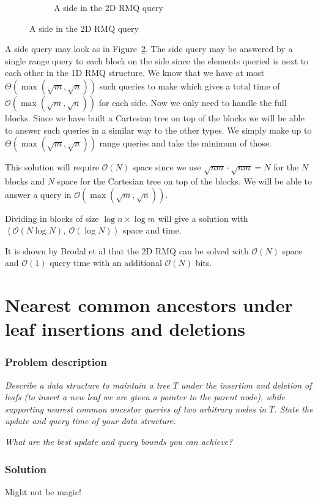 \documentclass[a4paper,oneside,article,11pt]{memoir}
\begin{document}
\begin{figure}[htbp!]
\begin{subfigure}[b]{0.49\textwidth}
        \caption{A side in the 2D RMQ query}
        \label{fig:rmq_side}
    \end{subfigure}
\end{figure}

A side query may look as in Figure~\ref{fig:rmq_side}. The side query may be answered by a single range query to each block on the side since the elements queried is next to each other in the 1D RMQ structure. We know that we have at most $\Theta(\max(\sqrt{m},\sqrt{n}))$ such queries to make which gives a total time of $\mathcal{O}(\max(\sqrt{m},\sqrt{n}))$ for each side.
Now we only need to handle the full blocks. Since we have built a Cartesian tree on top of the blocks we will be able to answer such queries in a similar way to the other types. We simply make up to $\Theta(\max(\sqrt{m},\sqrt{n}))$ range queries and take the minimum of those.

This solution will require $\mathcal{O}(N)$ space since we use $\sqrt{nm} \cdot \sqrt{nm} = N$ for the $N$ blocks and $N$ space for the Cartesian tree on top of the blocks. We will be able to answer a query in $\mathcal{O}(\max(\sqrt{m},\sqrt{n}))$.

Dividing in blocks of size $\log n \times \log m$ will give a solution with $\left\langle \mathcal{O}(N\log N),\ \mathcal{O}(\log N)\right\rangle$ space and time.

It is shown by Brodal et al\cite{algorithmica12min} that the 2D RMQ can be solved with $\mathcal{O}(N)$ space and $\mathcal{O}(1)$ query time with an additional $\mathcal{O}(N)$ bits.


\chapter{Nearest common ancestors under leaf insertions and deletions}
\label{chp:LCA}
\subsection{Problem description}
\textit{Describe a data structure to maintain a tree $T$ under the insertion and deletion of leafs (to insert a new leaf we are given a pointer to the parent node), while supporting nearest common ancestor queries of two arbitrary nodes in $T$. State the update and query time of your data structure.}

\textit{What are the best update and query bounds you can achieve?}

\subsection{Solution}
Might not be magic!
\end{document}
